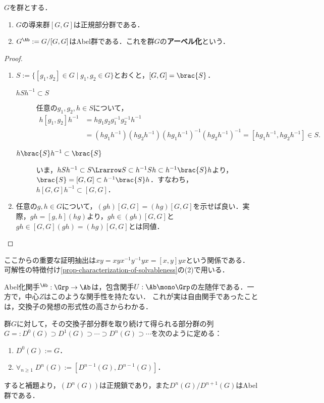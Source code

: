\documentclass[uplatex,dvipdfmx]{jsreport}
\begin{document}
\begin{lemma}[商群がアーベル群になる条件]\label{lemma-commutator-subgroup}
    $G$を群とする．
    \begin{enumerate}
        \item $G$の導来群$[G,G]$は正規部分群である．
        \item $G^\Ab:=G/[G,G]$はAbel群である．これを群$G$の\textbf{アーベル化}という．
    \end{enumerate}
\end{lemma}
\begin{proof}\mbox{}
    \begin{enumerate}
        \item $S:=\{[g_1,g_2]\in G\mid g_1,g_2\in G\}$とおくと，$[G,G]=\brac{S}$．
        \begin{description}
            \item[$hSh^{-1}\subset S$] 任意の$g_1,g_2,h\in S$について， \begin{align*}
                h[g_1,g_2]h^{-1}&=hg_1g_2g_1^{-1}g_2^{-1}h^{-1}\\
                &=(hg_1h^{-1})(hg_2h^{-1})(hg_1h^{-1})^{-1}(hg_2h^{-1})^{-1}=[hg_1h^{-1},hg_2h^{-1}]\in S.
            \end{align*}
            \item[$h\brac{S}h^{-1}\subset\brac{S}$] いま，$hSh^{-1}\subset S\Lrarrow S\subset h^{-1}Sh\subset h^{-1}\brac{S}h$より，$\brac{S}=[G,G]\subset h^{-1}\brac{S}h$．すなわち，$h[G,G]h^{-1}\subset[G,G]$．
        \end{description}
        \item 任意の$g,h\in G$について，$(gh)[G,G]=(hg)[G,G]$を示せば良い．実際，$gh=[g,h](hg)$より，$gh\in(gh)[G,G]$と$gh\in[G,G](gh)=(hg)[G,G]$とは同値．
    \end{enumerate}
\end{proof}
\begin{remarks}
    ここからの重要な証明抽出は$xy=xyx^{-1}y^{-1}yx=[x,y]yx$という関係である．
    可解性の特徴付け\ref{prop-characterization-of-solvableness}の(2)で用いる．
\end{remarks}
\begin{remark}[交換子とは自由構成の発想である]
    Abel化関手${}^\Ab:\Grp\to\Ab$は，包含関手$U:\Ab\mono\Grp$の左随伴である．一方で，中心$Z$はこのような関手性を持たない．
    これが実は自由関手であったことは，交換子の発想の形式性の高さからわかる．
\end{remark}

\begin{definition}
    群$G$に対して，その交換子部分群を取り続けて得られる部分群の列$G=:D^0(G)\supset D^1(G)\supset\cdots\supset D^n(G)\supset\cdots$を次のように定める：
    \begin{enumerate}
        \item $D^0(G):=G$．
        \item $\forall_{n\ge 1}\;D^n(G):=[D^{n-1}(G),D^{n-1}(G)]$．
    \end{enumerate}
    すると補題より，$(D^n(G))$は正規鎖であり，また$D^n(G)/D^{n+1}(G)$はAbel群である．
\end{definition}
\end{document}
